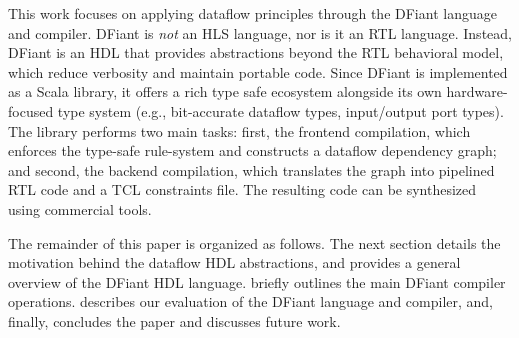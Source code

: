 This work focuses on applying dataflow principles through the DFiant language and compiler. DFiant is \emph{not} an HLS language, nor is it an RTL language. Instead, DFiant is an HDL that provides abstractions beyond the RTL behavioral model, which reduce verbosity and maintain portable code. Since DFiant is implemented as a Scala library, it offers a rich type safe ecosystem alongside its own hardware-focused type system (e.g., bit-accurate dataflow types, input/output port types). The library performs two main tasks: first, the frontend compilation, which enforces the type-safe rule-system and constructs a dataflow dependency graph; and second, the backend compilation, which translates the graph into pipelined RTL code and a TCL constraints file. The resulting code can be synthesized using commercial tools. 

The remainder of this paper is organized as follows. The next section details the motivation behind the dataflow HDL abstractions, and  provides a general overview of the DFiant HDL language. 
 briefly outlines the main DFiant compiler operations.
 describes our evaluation of the DFiant language and compiler, and, finally,  concludes the paper and discusses future work.

 